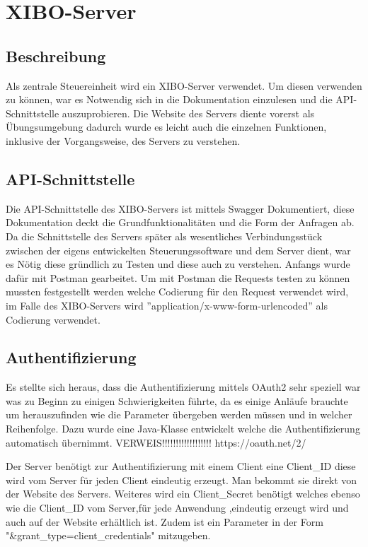 \chapter{XIBO-Server}
\section{Beschreibung}
Als zentrale Steuereinheit wird ein XIBO-Server verwendet. Um diesen verwenden zu können, war es Notwendig sich in die Dokumentation einzulesen und die API-Schnittstelle auszuprobieren. Die Website des Servers diente vorerst als Übungsumgebung dadurch wurde es leicht auch die einzelnen Funktionen, inklusive der Vorgangsweise, des Servers zu verstehen.

\section{API-Schnittstelle}
Die API-Schnittstelle des XIBO-Servers ist mittels Swagger Dokumentiert, diese Dokumentation deckt die Grundfunktionalitäten und die Form der Anfragen ab. Da die Schnittstelle des Servers später als wesentliches Verbindungsstück zwischen der eigens entwickelten Steuerungssoftware und dem Server dient, war es Nötig diese gründlich zu Testen und diese auch zu verstehen. Anfangs wurde dafür mit Postman gearbeitet. Um mit Postman die Requests testen zu können mussten festgestellt werden welche Codierung für den Request verwendet wird, im Falle des XIBO-Servers wird ''application/x-www-form-urlencoded'' als Codierung verwendet.


\section{Authentifizierung}
Es stellte sich heraus, dass die Authentifizierung mittels OAuth2 sehr speziell war was zu Beginn zu einigen Schwierigkeiten führte, da es einige Anläufe brauchte um herauszufinden wie die Parameter übergeben werden müssen und in welcher Reihenfolge. Dazu wurde eine Java-Klasse entwickelt welche die Authentifizierung automatisch übernimmt.
VERWEIS!!!!!!!!!!!!!!!!!!
https://oauth.net/2/

Der Server benötigt zur Authentifizierung mit einem Client eine Client_ID diese wird vom Server für jeden Client eindeutig erzeugt. Man bekommt sie direkt von der Website des Servers. 
Weiteres wird ein Client_Secret benötigt welches ebenso wie die Client_ID vom Server,für jede Anwendung ,eindeutig erzeugt wird und auch auf der Website erhältlich ist. Zudem ist ein Parameter in der Form "&grant_type=client_credentials" mitzugeben.

